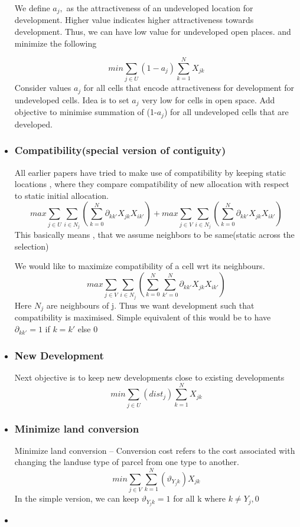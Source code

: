 \documentclass[twoside,10pt]{article}
\begin{document}
\begin{itemize}
We define $ a_{j},$ as the attractiveness of an undeveloped location for development. Higher value indicates higher attractiveness towards development.  Thus, we can have low value for undeveloped open places. and minimize the following

 $$
 min\sum_{j \in U} (1-a_j) \sum_{k=1}^N X_{jk}
 $$
Consider values $a_j$  for all cells that encode attractiveness for development for undeveloped cells. Idea is to set $a_j$ very low for cells in open space. Add objective to minimise summation of (1-$a_j$) for all undeveloped cells that are developed. 

\item 
\subsubsection*{ Compatibility(special version of contiguity)}
All earlier papers have tried to make use of compatibility by keeping static locations , where they compare compatibility of new allocation with respect to static initial allocation.
 $$
max \sum_{j \in U} \sum_{i \in N_j}(\sum_{k=0}^{N}\partial_{kk'} X_{jk} X_{ik'})
 +max \sum_{j \in V} \sum_{i \in N_j}(\sum_{k=0}^{N}\partial_{kk'} X_{jk} X_{ik'})
 $$
 This basically means , that we assume neighbors to be same(static across the selection) 

We would like to maximize compatibility of a cell wrt its neighbours.
$$
max \sum_{j \in V}  \sum_{i \in N_j}(\sum_{k=0}^{N}\sum_{k'=0}^{N}\partial_{kk'} X_{jk} X_{ik'})
 $$
Here $N_j $ are neighbours of j. Thus we want development such that compatibility is maximised. Simple equivalent of this would be to have $\partial_{kk'} = 1 $ if  $k =k'$ else $0$

\item
\subsubsection*{ New Development}
Next objective is to keep new developments close to existing developments
 $$
 min\sum_{j \in U}(dist_j) \sum_{k=1}^N X_{jk}
 $$

\item

\subsubsection*{Minimize land conversion }
Minimize land conversion -- Conversion cost refers to the cost associated with changing the landuse type of parcel from one type to another.
$$
 min\sum_{j \in V}  \sum_{k=1}^N (\vartheta_{Y_{j}k}) X_{jk}
 $$
In the simple version, we can keep $\vartheta_{Y_{j}k} =  1$ for all k where $k \neq Y_{j},0$
\item

\end{itemize}
\end{document}
